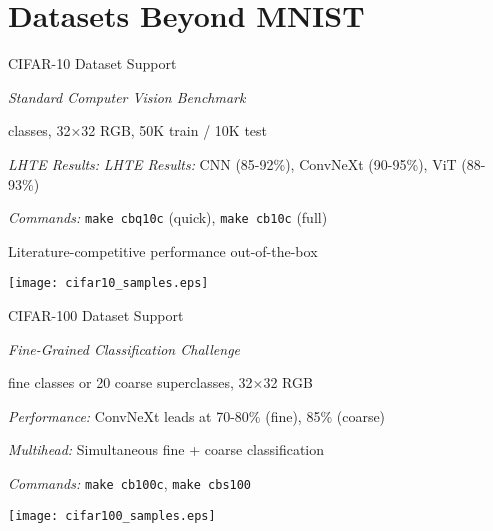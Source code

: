 \section[toc={New Dataset Formats}]{Datasets Beyond MNIST}

\begin{slide}[\slideopts,toc={CIFAR-10}]{CIFAR-10 Dataset Support}
  
  \emph{Standard Computer Vision Benchmark}
  
  \begin{itemize}
     classes, 32×32 RGB, 50K train / 10K test
    
    \mpitem \emph{LHTE Results:}
    \mpitem \emph{LHTE Results:} CNN (85-92\%), ConvNeXt (90-95\%), ViT (88-93\%)
    
    \mpitem \emph{Commands:} \texttt{make cbq10c} (quick), \texttt{make cb10c} (full)
    
    \mpitem Literature-competitive performance out-of-the-box
  \end{itemize}
  
  \vspace{0.5em}
  \centerline{\texttt{[image: cifar10\_samples.eps]}}
\end{slide}

\begin{slide}[\slideopts,toc={CIFAR-100}]{CIFAR-100 Dataset Support}
  
  \emph{Fine-Grained Classification Challenge}
  
  \begin{itemize}
     fine classes or 20 coarse superclasses, 32×32 RGB
    
    \mpitem \emph{Performance:} ConvNeXt leads at 70-80\% (fine), 85\% (coarse)
    
    \mpitem \emph{Multihead:} Simultaneous fine + coarse classification
    
    \mpitem \emph{Commands:} \texttt{make cb100c}, \texttt{make cbs100}
  \end{itemize}
  
  \vspace{0.5em}
  \centerline{\texttt{[image: cifar100\_samples.eps]}}
\end{slide}

